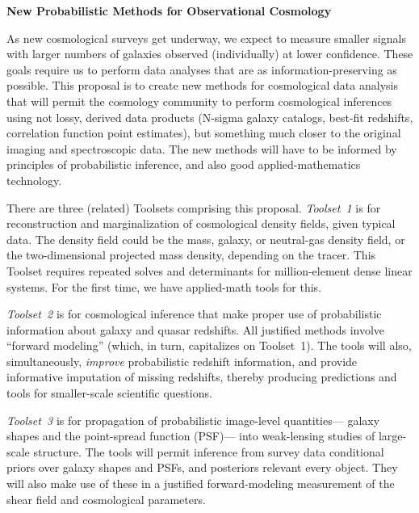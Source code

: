 \documentclass[12pt]{article}
\begin{document}
\sloppy\sloppypar\thispagestyle{empty}

\noindent
\textbf{New Probabilistic Methods for Observational Cosmology} %
\smallskip

As new cosmological surveys get underway,
we expect to measure smaller signals with larger numbers of galaxies
observed (individually) at lower confidence.
These goals require us to perform data
analyses that are as information-preserving as possible.
This proposal is to create new methods for cosmological data analysis
that will permit the cosmology community to perform cosmological
inferences using not lossy, derived data products (N-sigma galaxy
catalogs, best-fit redshifts, correlation function point estimates),
but something much closer to the original imaging and spectroscopic
data.
The new methods will have to be informed by principles of
probabilistic inference, and also good applied-mathematics technology.

There are three (related) Toolsets comprising this proposal.
\textsl{Toolset~1} is for reconstruction and marginalization
of cosmological density fields, given typical data.
The density field could be the mass, galaxy, or 
neutral-gas density field, or the two-dimensional projected mass density,
depending on the tracer.
This Toolset requires repeated solves and determinants for
million-element dense linear systems.  For the first time, we
have applied-math tools for this.

\textsl{Toolset~2} is for cosmological inference that make proper
use of probabilistic information about galaxy and quasar redshifts.
All justified methods involve ``forward modeling'' (which, in turn,
capitalizes on Toolset~1).  The tools will also, simultaneously,
\emph{improve} probabilistic redshift information, and provide
informative imputation of missing redshifts, thereby producing
predictions and tools for smaller-scale scientific questions.

\textsl{Toolset~3} is for propagation of probabilistic image-level quantities---%
galaxy shapes and the point-spread function (PSF)---%
into weak-lensing studies of large-scale structure.
The tools will permit inference from survey data conditional priors over
galaxy shapes and PSFs, and posteriors relevant every object.
They will also make use of these in a justified forward-modeling
measurement of the shear field and cosmological parameters.
\end{document}
